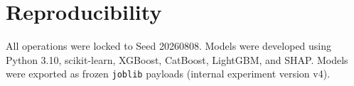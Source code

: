 \documentclass[journal, twocolumn]{IEEEtran}
\begin{document}
\section{Reproducibility}
All operations were locked to Seed 20260808. Models were developed using Python 3.10, scikit-learn, XGBoost, CatBoost, LightGBM, and SHAP. Models were exported as frozen \texttt{joblib} payloads (internal experiment version v4).



\end{document}
